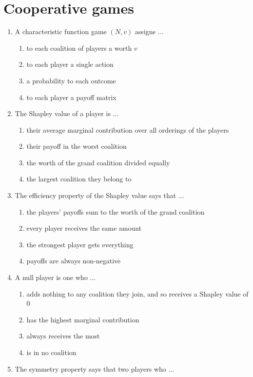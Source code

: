 \documentclass[11pt]{article}
\begin{document}
\section*{Cooperative games}
\begin{enumerate}[itemsep=6pt]
  \item A characteristic function game \((N, v)\) assigns ...
  \begin{enumerate}
    \item to each coalition of players a worth \(v\)
    \item to each player a single action
    \item a probability to each outcome
    \item to each player a payoff matrix
  \end{enumerate}
  \item The Shapley value of a player is ...
  \begin{enumerate}
    \item their average marginal contribution over all orderings of the players
    \item their payoff in the worst coalition
    \item the worth of the grand coalition divided equally
    \item the largest coalition they belong to
  \end{enumerate}
  \item The efficiency property of the Shapley value says that ...
  \begin{enumerate}
    \item the players' payoffs sum to the worth of the grand coalition
    \item every player receives the same amount
    \item the strongest player gets everything
    \item payoffs are always non-negative
  \end{enumerate}
  \item A null player is one who ...
  \begin{enumerate}
    \item adds nothing to any coalition they join, and so receives a Shapley value of \(0\)
    \item has the highest marginal contribution
    \item always receives the most
    \item is in no coalition
  \end{enumerate}
  \item The symmetry property says that two players who ...

\end{enumerate}
\end{document}

